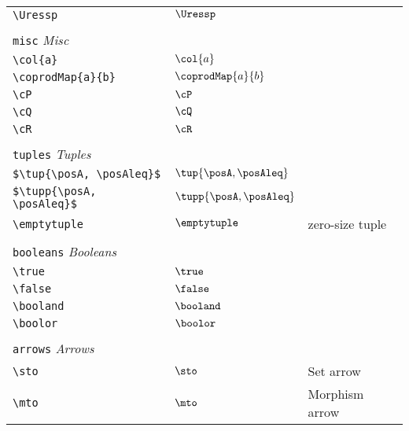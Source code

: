 \begin{longtable}{lll}
 {\color[rgb]{0.5,0.5,0.5}\texttt{\textbackslash Uressp}} & $\Uressp$ & \\ 
  &  & \\ 
 \multicolumn{3}{l}{{\color[rgb]{0.5,0.5,0.5}\texttt{misc}} \emph{Misc}}\\ 
 \hline
\hline
{\color[rgb]{0.5,0.5,0.5}\texttt{\textbackslash col\{a\}}} & $\col{a}$ & \\ 
 {\color[rgb]{0.5,0.5,0.5}\texttt{\textbackslash coprodMap\{a\}\{b\}}} & $\coprodMap{a}{b}$ & \\ 
 {\color[rgb]{0.5,0.5,0.5}\texttt{\textbackslash cP}} & $\cP$ & \\ 
 {\color[rgb]{0.5,0.5,0.5}\texttt{\textbackslash cQ}} & $\cQ$ & \\ 
 {\color[rgb]{0.5,0.5,0.5}\texttt{\textbackslash cR}} & $\cR$ & \\ 
  &  & \\ 
 \multicolumn{3}{l}{{\color[rgb]{0.5,0.5,0.5}\texttt{tuples}} \emph{Tuples}}\\ 
 \hline
\hline
{\color[rgb]{0.5,0.5,0.5}\texttt{\$\textbackslash tup\{\textbackslash posA, \textbackslash posAleq\}\$}} & $\tup{\posA, \posAleq}$ & \\ 
 {\color[rgb]{0.5,0.5,0.5}\texttt{\$\textbackslash tupp\{\textbackslash posA, \textbackslash posAleq\}\$}} & $\tupp{\posA, \posAleq}$ & \\ 
 {\color[rgb]{0.5,0.5,0.5}\texttt{\textbackslash emptytuple}} & $\emptytuple$ &  zero-size tuple\\ 
  &  & \\ 
 \multicolumn{3}{l}{{\color[rgb]{0.5,0.5,0.5}\texttt{booleans}} \emph{Booleans}}\\ 
 \hline
\hline
{\color[rgb]{0.5,0.5,0.5}\texttt{\textbackslash true}} & $\true$ & \\ 
 {\color[rgb]{0.5,0.5,0.5}\texttt{\textbackslash false}} & $\false$ & \\ 
 {\color[rgb]{0.5,0.5,0.5}\texttt{\textbackslash booland}} & $\booland$ & \\ 
 {\color[rgb]{0.5,0.5,0.5}\texttt{\textbackslash boolor}} & $\boolor$ & \\ 
  &  & \\ 
 \multicolumn{3}{l}{{\color[rgb]{0.5,0.5,0.5}\texttt{arrows}} \emph{Arrows}}\\ 
 \hline
\hline
{\color[rgb]{0.5,0.5,0.5}\texttt{\textbackslash sto}} & $\sto$ &  Set arrow\\ 
 {\color[rgb]{0.5,0.5,0.5}\texttt{\textbackslash mto}} & $\mto$ &  Morphism arrow\\ 

\end{longtable}
